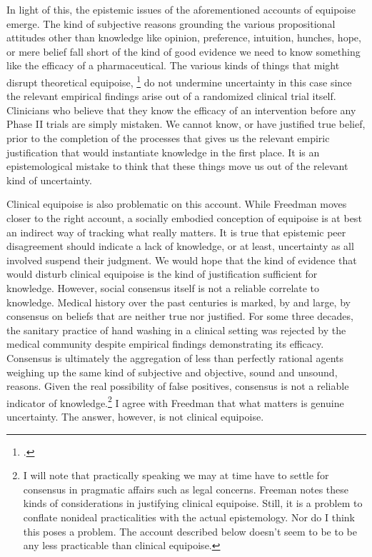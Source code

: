 \documentclass[letterpaper,notitlepage,12pt]{article}
\begin{document}
In light of this, the epistemic issues of the aforementioned accounts
of equipoise emerge.
The kind of subjective reasons grounding the various propositional attitudes other
than knowledge like opinion, preference, intuition, hunches, hope, or mere 
belief fall short of the kind
of good evidence we need to know something like the efficacy of a
pharmaceutical.
The various kinds of things that might disrupt theoretical equipoise,
\footcite[p. 429]{freedman_equipoise_1987} do not undermine
uncertainty in this case since the relevant empirical findings arise out of
a randomized clinical trial itself.
Clinicians who believe that they know the efficacy of an intervention before any
Phase II trials are simply mistaken.
We cannot know, or have justified true belief, prior to the completion of the
processes that gives us the relevant empiric justification that would instantiate
knowledge in the first place.
It is an epistemological mistake to think that these things move us out of the
relevant kind of uncertainty.

Clinical equipoise is also problematic on this account.
While Freedman moves closer to the right account, a socially embodied conception
of equipoise is at best an indirect way of tracking what really matters.
It is true that epistemic peer disagreement should indicate a lack of knowledge,
or at least, uncertainty as all involved suspend their judgment.
We would hope that the kind of evidence that would
disturb clinical equipoise is the kind of justification sufficient for
knowledge.
However, social consensus itself is not a reliable correlate to knowledge.
Medical history over the past centuries is marked, by and large, by consensus on
beliefs that are neither true nor justified.
For some three decades, the sanitary practice of hand washing in a clinical
setting was rejected by the medical community despite empirical findings
demonstrating its efficacy.
Consensus is ultimately the aggregation of less than perfectly rational agents
weighing up the same kind of subjective and objective, sound and unsound,
reasons.
Given the real possibility of false positives, consensus is not a reliable
indicator of knowledge.\footnote{I will note that practically speaking we may at
  time have to settle for consensus in pragmatic affairs such as legal concerns.
  Freeman notes these kinds of considerations in justifying clinical equipoise.
  Still, it is a problem to conflate nonideal practicalities with the actual
  epistemology. Nor do I think this poses a problem. The account described below
doesn't seem to be to be any less practicable than clinical equipoise.}
I agree with Freedman that what matters is genuine uncertainty.
The answer, however, is not clinical equipoise.
\end{document}
